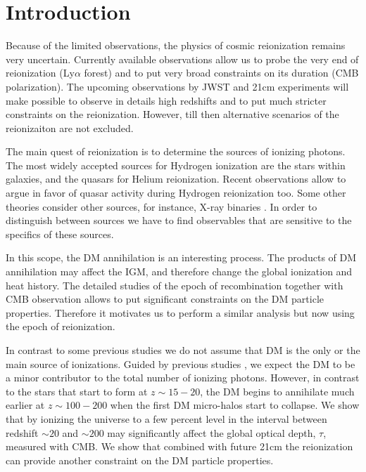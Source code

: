 \section{Introduction}

Because of the limited observations, the physics of cosmic reionization remains very uncertain. Currently available observations allow us to probe the very end of reionization (Ly$\alpha$ forest) and to put very broad constraints on its duration (CMB polarization). The upcoming observations by JWST and 21cm experiments will make possible to observe in details high redshifts and to put much stricter constraints on the reionization. However, till then alternative scenarios of the reionizaiton are not excluded.

The main quest of reionization is to determine the sources of ionizing photons. The most widely accepted sources for Hydrogen ionization are the stars within galaxies, and the quasars for Helium reionization. Recent observations allow \cite{2015arXiv150707678M} to argue in favor of quasar activity during Hydrogen reionization too. Some other theories consider other sources, for instance, X-ray binaries \cite{Fialkov_2014}. In order to distinguish between sources we have to find observables that are sensitive to the specifics of these sources.

In this scope, the DM annihilation is an interesting process. The products of DM annihilation may affect the IGM, and therefore change the global ionization and heat history. The detailed studies of the epoch of recombination together with CMB observation allows \citet{2015arXiv150603811S} to put significant constraints on the DM particle properties. Therefore it motivates us to perform a similar analysis but now using the epoch of reionization. 

In contrast to some previous studies \cite{2009JCAP...10..009C, 2009PhRvD..80c5007B} we do not assume that DM is the only or the main source of ionizations. Guided by previous studies \cite{H_tsi_2009}, we expect the DM to be a minor contributor to the total number of ionizing photons. However, in contrast to the stars that start to form at $z\sim 15-20$, the DM begins to annihilate much earlier at $z\sim100-200$ when the first DM micro-halos start to collapse. We show that by ionizing the universe to a few percent level in the interval between redshift $\sim20$ and $\sim200$ may significantly affect the global optical depth, $\tau$, measured with CMB. We show that combined with future 21cm the reionization can provide another constraint on the DM particle properties.


